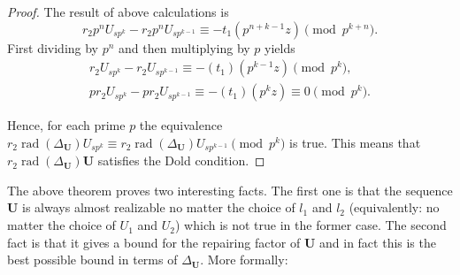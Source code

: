 \documentclass[preprint,12pt]{elsarticle}
\DeclareMathOperator{\rad}{rad}
\begin{document}
\begin{proof}
    The result of above calculations is
    $$r_2p^nU_{sp^k} - r_2p^nU_{sp^{k-1}} \equiv -t_1(p^{n+k-1}z)  \pmod{p^{k+n}}.$$
    First dividing by $p^n$ and then multiplying by $p$ yields
    \begin{align}
        r_2U_{sp^k} - r_2U_{sp^{k-1}} \equiv -(t_1)(p^{k-1}z) \pmod{p^{k}}, \\
         pr_2U_{sp^k} - pr_2U_{sp^{k-1}} \equiv -(t_1)(p^{k}z) \equiv 0 \pmod{p^{k}}.
    \end{align}


    Hence, for each  prime $p$ the equivalence $r_2\rad(\Delta_{\mathbf U})U_{sp^k} \equiv r_2\rad(\Delta_{\mathbf U})U_{sp^{k-1}}\pmod{p^k}$ is true. This means that $r_2\rad(\Delta_{\mathbf U}){\mathbf U}$ satisfies the Dold condition.
\end{proof}

The above theorem proves two interesting facts. The first one is that the sequence ${\mathbf U}$ is always almost realizable no matter the choice of $l_1$ and $l_2$ (equivalently: no matter the choice of $U_1$ and $U_2$) which is not true in the former case. The second fact is that it gives a bound for the repairing factor of ${\mathbf U}$ and in fact this is the best possible bound in terms of $\Delta_{{\mathbf U}}$. More formally:
\end{document}
